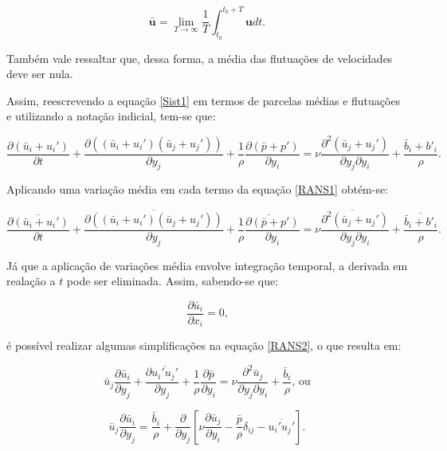 \documentclass[_ArquivoPrincipal.tex]{subfiles}
\begin{document}
\begin{equation}
    \bar{\mathbf{u}}=\lim_{T\to\infty}{\frac{1}{T}\int_{t_0}^{t_0+T}{\mathbf{u}dt}}\text{.}
    \label{umed}
\end{equation}

\noindent Também vale ressaltar que, dessa forma, a média das flutuações de velocidades deve ser nula.

Assim, reescrevendo a equação \ref{Sist1} em termos de parcelas médias e flutuações e utilizando a notação indicial, tem-se que:

\begin{equation}
    \frac{\partial(\bar{u}_i+u_i')}{\partial t}+\frac{\partial((\bar{u}_i+u_i')(\bar{u}_j+u_j'))}{\partial y_j}+\frac{1}{\rho}\frac{\partial(\bar{p}+p')}{\partial y_i}=\nu\frac{\partial^2(\bar{u}_j+u_j')}{\partial y_j\partial y_i}+\frac{\bar{b}_i+b'_i}{\rho}\text{.}
    \label{RANS1}
\end{equation}

Aplicando uma variação média em cada termo da equação \ref{RANS1} obtém-se:

\begin{equation}
    \overline{\frac{\partial(\bar{u}_i+u_i')}{\partial t}}+\overline{\frac{\partial((\bar{u}_i+u_i')(\bar{u}_j+u_j'))}{\partial y_j}}+\overline{\frac{1}{\rho}\frac{\partial(\bar{p}+p')}{\partial y_i}}=\overline{\nu\frac{\partial^2(\bar{u}_j+u_j')}{\partial y_j\partial y_i}}+\overline{\frac{\bar{b}_i+b'_i}{\rho}}\text{.}
    \label{RANS2}
\end{equation}

Já que a aplicação de variações média envolve integração temporal, a derivada em realação a $t$ pode ser eliminada. Assim, sabendo-se que:

\begin{equation}
    \frac{\partial\bar{u}_i}{\partial x_i}=0\text{,}
    \label{dudxi}
\end{equation}

\noindent é possível realizar algumas simplificações na equação \ref{RANS2}, o que resulta em:

\begin{equation}
    \bar{u}_j\frac{\partial\bar{u}_i}{\partial y_j}+\frac{\partial\overline{u_i'u_j'}}{\partial y_j}+\frac{1}{\rho}\frac{\partial\bar{p}}{\partial y_i}=\nu\frac{\partial^2\bar{u}_j}{\partial y_j\partial y_i}+\frac{\bar{b}_i}{\rho}\text{, ou}
    \label{RANS3}
\end{equation}

\begin{equation}
    \bar{u}_j\frac{\partial\bar{u}_i}{\partial y_j}=\frac{\bar{b}_i}{\rho}+\frac{\partial}{\partial y_j}\left[\nu\frac{\partial\bar{u}_j}{\partial y_i}-\frac{\bar{p}}{\rho}\delta_{ij}-\overline{u_i'u_j'}\right]\text{.}
    \label{RANS4}
\end{equation}
\end{document}
